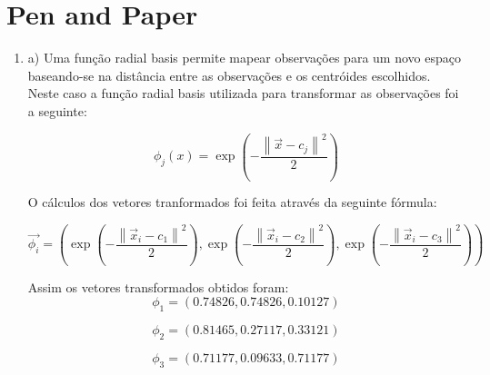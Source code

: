 \documentclass[a4paper,12pt]{article} %
\begin{document}
\section*{Pen and Paper}
\begin{enumerate}

\item 




a) Uma função radial basis permite mapear observações para um novo espaço 
baseando-se na distância entre as observações e os centróides escolhidos.
Neste caso a função radial basis utilizada para transformar as observações foi 
a seguinte:

\begin{equation}
    \phi_j (x) = \exp\left(-\frac{\left\|\vec{x}-c_j\right\|^2}{2}\right)
\end{equation}

O cálculos dos vetores tranformados foi feita através da seguinte fórmula:

\begin{equation}
\vec{\phi_i} = \left( \exp\left(-\frac{\left\|\vec{x}_i-c_1\right\|^2}{2}\right)   , \exp\left(-\frac{\left\|\vec{x}_i-c_2\right\|^2}{2}\right)  , \exp\left(-\frac{\left\|\vec{x}_i-c_3\right\|^2}{2}\right)   \right)
\end{equation}

Assim os vetores transformados obtidos foram:
\begin{equation*}
    \phi_1 = (0.74826,0.74826,0.10127)
\end{equation*}

\begin{equation*}
    \phi_2 = (0.81465,0.27117,0.33121)
\end{equation*}

\begin{equation*}
    \phi_3 = (0.71177,0.09633,0.71177)
\end{equation*}


\end{enumerate}
\end{document}

